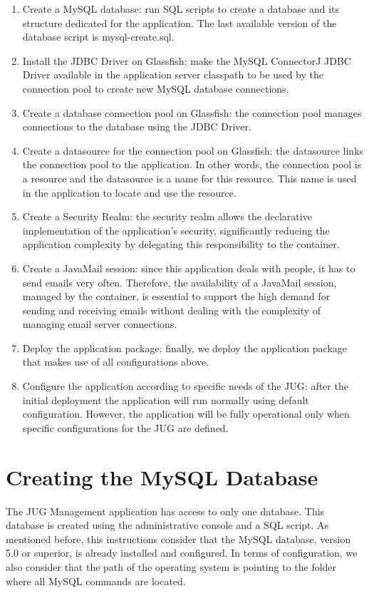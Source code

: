 \documentclass[envcountsame,envcountchap]{svmono}
\begin{document}
\begin{enumerate}
\item Create a MySQL database: run SQL scripts to create a database and its structure dedicated for the application. The last available version of the database script is mysql-create.sql.
\item Install the JDBC Driver on Glassfish: make the MySQL ConnectorJ JDBC Driver available in the application server classpath to be used by the connection pool to create new MySQL database connections.
\item Create a database connection pool on Glassfish: the connection pool manages connections to the database using the JDBC Driver.
\item Create a datasource for the connection pool on Glassfish: the datasource links the connection pool to the application. In other words, the connection pool is a resource and the datasource is a name for this resource. This name is used in the application to locate and use the resource.
\item Create a Security Realm: the security realm allows the declarative implementation of the application's security, significantly reducing the application complexity by delegating this responsibility to the container.
\item Create a JavaMail session: since this application deals with people, it has to send emails very often. Therefore, the availability of a JavaMail session, managed by the container, is essential to support the high demand for sending and receiving emails without dealing with the complexity of managing email server connections.
\item Deploy the application package: finally, we deploy the application package that makes use of all configurations above.
\item Configure the application according to specific needs of the JUG: after the initial deployment the application will run normally using default configuration. However, the application will be fully operational only when specific configurations for the JUG are defined.
\end{enumerate}

\section{Creating the MySQL Database}

The JUG Management application has access to only one database. This database is created using the administrative console and a SQL script. As mentioned before, this instructions consider that the MySQL database, version 5.0 or superior, is already installed and configured. In terms of configuration, we also consider that the path of the operating system is pointing to the folder where all MySQL commands are located.
\end{document}
